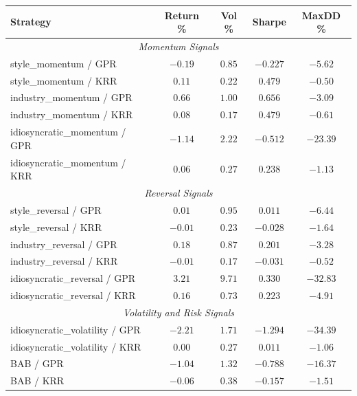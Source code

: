 \documentclass[11pt]{amsart}
\begin{document}
\begin{table}[htp]
  \centering
  \small
  \begin{tabular}{lcccc}
    \toprule
    \textbf{Strategy} & \textbf{Return \%} & \textbf{Vol \%} & \textbf{Sharpe} & \textbf{MaxDD \%} \\
    \midrule
    \multicolumn{5}{c}{\emph{Momentum Signals}} \\
    style\_momentum / GPR           & $-0.19$   & $0.85$   & $-0.227$ & $-5.62$   \\
    style\_momentum / KRR           & $0.11$    & $0.22$   & $0.479$  & $-0.50$   \\
    industry\_momentum / GPR        & $0.66$    & $1.00$   & $0.656$  & $-3.09$   \\
    industry\_momentum / KRR        & $0.08$    & $0.17$   & $0.479$  & $-0.61$   \\
    idiosyncratic\_momentum / GPR   & $-1.14$   & $2.22$   & $-0.512$ & $-23.39$  \\
    idiosyncratic\_momentum / KRR   & $0.06$    & $0.27$   & $0.238$  & $-1.13$   \\
    \midrule
    \multicolumn{5}{c}{\emph{Reversal Signals}} \\
    style\_reversal / GPR           & $0.01$    & $0.95$   & $0.011$  & $-6.44$   \\
    style\_reversal / KRR           & $-0.01$   & $0.23$   & $-0.028$ & $-1.64$   \\
    industry\_reversal / GPR        & $0.18$    & $0.87$   & $0.201$  & $-3.28$   \\
    industry\_reversal / KRR        & $-0.01$   & $0.17$   & $-0.031$ & $-0.52$   \\
    idiosyncratic\_reversal / GPR   & $3.21$    & $9.71$   & $0.330$  & $-32.83$  \\
    idiosyncratic\_reversal / KRR   & $0.16$    & $0.73$   & $0.223$  & $-4.91$   \\
    \midrule
    \multicolumn{5}{c}{\emph{Volatility and Risk Signals}} \\
    idiosyncratic\_volatility / GPR & $-2.21$   & $1.71$   & $-1.294$ & $-34.39$  \\
    idiosyncratic\_volatility / KRR & $0.00$    & $0.27$   & $0.011$  & $-1.06$   \\
    BAB / GPR                       & $-1.04$   & $1.32$   & $-0.788$ & $-16.37$  \\
    BAB / KRR                       & $-0.06$   & $0.38$   & $-0.157$ & $-1.51$   \\

\end{tabular}
\end{table}
\end{document}
